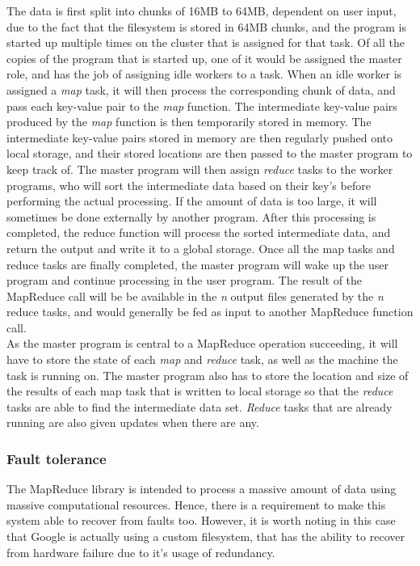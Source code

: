 \documentclass[]{article}
\begin{document}
The data is first split into chunks of 16MB to 64MB, dependent on user input, due to the fact that the filesystem is stored in 64MB chunks, and the program is started up multiple times on the cluster that is assigned for that task. Of all the copies of the program that is started up, one of it would be assigned the master role, and has the job of assigning idle workers to a task. When an idle worker is assigned a \emph{map} task, it will then process the corresponding chunk of data, and pass each key-value pair to the \emph{map} function. The intermediate key-value pairs produced by the \emph{map} function is then temporarily stored in memory. The intermediate key-value pairs stored in memory are then regularly pushed onto local storage, and their stored locations are then passed to the master program to keep track of. The master program will then assign \emph{reduce} tasks to the worker programs, who will sort the intermediate data based on their key's before performing the actual processing. If the amount of data is too large, it will sometimes be done externally by another program. After this processing is completed, the reduce function will process the sorted intermediate data, and return the output and write it to a global storage. Once all the map tasks and reduce tasks are finally completed, the master program will wake up the user program and continue processing in the user program. The result of the MapReduce call will be be available in the \emph{n} output files generated by the \emph{n} reduce tasks, and would generally be fed as input to another MapReduce function call.\\

As the master program is central to a MapReduce operation succeeding, it will have to store the state of each \emph{map} and \emph{reduce} task, as well as the machine the task is running on. The master program also has to store the location and size of the results of each map task that is written to local storage so that the \emph{reduce} tasks are able to find the intermediate data set. \emph{Reduce} tasks that are already running are also given updates when there are any. \\

\subsubsection{Fault tolerance}
The MapReduce library is intended to process a massive amount of data using massive computational resources. Hence, there is a requirement to make this system able to recover from faults too. However, it is worth noting in this case that Google is actually using a custom filesystem, that has the ability to recover from hardware failure due to it's usage of redundancy.\\
\end{document}
